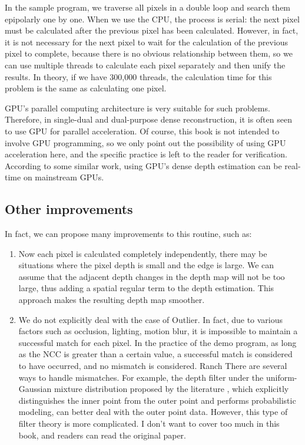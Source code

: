 In the sample program, we traverse all pixels in a double loop and search them epipolarly one by one. When we use the CPU, the process is serial: the next pixel must be calculated after the previous pixel has been calculated. However, in fact, it is not necessary for the next pixel to wait for the calculation of the previous pixel to complete, because there is no obvious relationship between them, so we can use multiple threads to calculate each pixel separately and then unify the results. In theory, if we have 300,000 threads, the calculation time for this problem is the same as calculating one pixel.

GPU's parallel computing architecture is very suitable for such problems. Therefore, in single-dual and dual-purpose dense reconstruction, it is often seen to use GPU for parallel acceleration. Of course, this book is not intended to involve GPU programming, so we only point out the possibility of using GPU acceleration here, and the specific practice is left to the reader for verification. According to some similar work, using GPU's dense depth estimation can be real-time on mainstream GPUs.

\subsection{Other improvements}
In fact, we can propose many improvements to this routine, such as:

\begin{enumerate}
\item Now each pixel is calculated completely independently, there may be situations where the pixel depth is small and the edge is large. We can assume that the adjacent depth changes in the depth map will not be too large, thus adding a spatial regular term to the depth estimation. This approach makes the resulting depth map smoother.
\item We do not explicitly deal with the case of Outlier. In fact, due to various factors such as occlusion, lighting, motion blur, it is impossible to maintain a successful match for each pixel. In the practice of the demo program, as long as the NCC is greater than a certain value, a successful match is considered to have occurred, and no mismatch is considered.
Ranch
\hspace{2em} There are several ways to handle mismatches. For example, the depth filter under the uniform-Gaussian mixture distribution proposed by the literature \cite{Vogiatzis2011}, which explicitly distinguishes the inner point from the outer point and performs probabilistic modeling, can better deal with the outer point data. However, this type of filter theory is more complicated. I don't want to cover too much in this book, and readers can read the original paper.
\end{enumerate}

